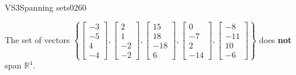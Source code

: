 \begin{exercise}{VS3}{Spanning sets}{0260}
\begin{exerciseAnswer}
 

 The set of vectors \(\left\{ \left[\begin{array}{c}
-3 \\
-5 \\
4 \\
-4
\end{array}\right] , \left[\begin{array}{c}
2 \\
1 \\
-2 \\
-2
\end{array}\right] , \left[\begin{array}{c}
15 \\
18 \\
-18 \\
6
\end{array}\right] , \left[\begin{array}{c}
0 \\
-7 \\
2 \\
-14
\end{array}\right] , \left[\begin{array}{c}
-8 \\
-11 \\
10 \\
-6
\end{array}\right] \right\}\) does \textbf{not} span \(\mathbb{R}^4\). 

 \end{exerciseAnswer}
 \end{exercise}


\newpage




